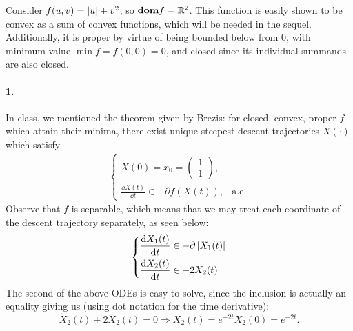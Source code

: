 \documentclass[10pt]{article}
\begin{document}
\allowdisplaybreaks
\everymath{\displaystyle}


\vspace{1em}
\begin{Exercise}
	\label{ex:p1}
	Consider $f(u, v) = \left| u \right| + v^2$, so $\textbf{dom} f = \mathbb{R}^2$. This function is
    easily shown to be convex as a sum of convex functions, which will be
    needed in the sequel. Additionally, it is proper by virtue of being bounded
    below from $0$, with minimum value $\min f = f(0, 0) = 0$, and closed since
    its individual summands are also closed.

    \paragraph{1.}
        In class, we mentioned the theorem given by Brezis: for closed, convex,
        proper $f$ which attain their minima, there exist unique steepest
        descent trajectories $X(\cdot)$ which satisfy
        \begin{align}
            \begin{cases}
                X(0) = x_0 = \begin{pmatrix} 1 \\ 1 \end{pmatrix}, & \\
                \frac{\dd{} X(t)}{\dd t} \in -\partial f(X(t)), & \text{a.e.}
            \end{cases}
            \label{eq:descent_trajectory}
        \end{align}
        Observe that $f$ is separable, which means that we may treat each
        coordinate of the descent trajectory separately, as seen below:
        \begin{align*}
            \left\{
            \begin{aligned}
                \frac{\mathrm{d}{} X_1(t)}{\mathrm{d}{t}} & \in
                -\partial \left| X_1(t) \right| \\
                \frac{\mathrm{d}{} X_2(t)}{\mathrm{d}{t}} & \in
                -2 X_2(t)
            \end{aligned} \right.
        \end{align*}
        The second of the above ODEs is easy to solve, since the inclusion is
        actually an equality giving us (using dot notation for the time
        derivative):
        \[
            \dot{X}_2(t) + 2 X_2(t) = 0 \Rightarrow
            X_2(t) = e^{-2t} X_2(0) = e^{-2t}.
\]
\end{Exercise}
\end{document}
